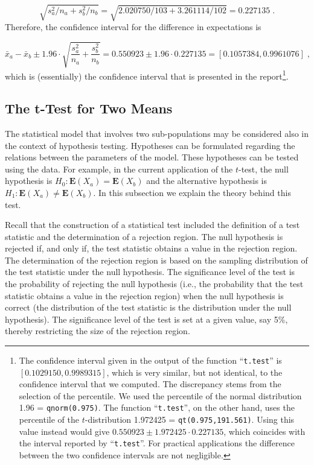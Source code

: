 \documentclass[]{krantz}
\newcommand{\Expec}{\mathbf{E}}
\theoremstyle{definition}
\theoremstyle{definition}
\theoremstyle{definition}
\theoremstyle{remark}
\begin{document}
\[\sqrt{s_a^2/n_a + s_b^2/n_b} = \sqrt{2.020750/103 + 3.261114/102} = 0.227135\;.\]
Therefore, the confidence interval for the difference in expectations is

\[\bar x_a- \bar x_b \pm 1.96 \cdot \sqrt{\frac{s_a^2}{n_a} + \frac{s_b^2}{n_b}} = 0.550923 \pm 1.96 \cdot 0.227135 = [0.1057384,0.9961076]\;,\]
which is (essentially) the confidence interval that is presented in the
report\footnote{The confidence interval given in the output of the function
  ``\texttt{t.test}'' is \([0.1029150, 0.9989315]\), which is very similar, but
  not identical, to the confidence interval that we computed. The
  discrepancy stems from the selection of the percentile. We used the
  percentile of the normal distribution 1.96 = \texttt{qnorm(0.975)}. The
  function ``\texttt{t.test}'', on the other hand, uses the percentile of the
  \(t\)-distribution 1.972425 = \texttt{qt(0.975,191.561)}. Using this value
  instead would give \(0.550923 \pm 1.972425 \cdot 0.227135\), which
  coincides with the interval reported by ``\texttt{t.test}''. For practical
  applications the difference between the two confidence intervals are
  not negligible.}.

\hypertarget{the-t-test-for-two-means}{%
\subsection{The t-Test for Two Means}\label{the-t-test-for-two-means}}

The statistical model that involves two sub-populations may be
considered also in the context of hypothesis testing. Hypotheses can be
formulated regarding the relations between the parameters of the model.
These hypotheses can be tested using the data. For example, in the
current application of the \(t\)-test, the null hypothesis is
\(H_0: \Expec(X_a) = \Expec(X_b)\) and the alternative hypothesis is
\(H_1: \Expec(X_a) \not= \Expec(X_b)\). In this subsection we explain the
theory behind this test.

Recall that the construction of a statistical test included the
definition of a test statistic and the determination of a rejection
region. The null hypothesis is rejected if, and only if, the test
statistic obtains a value in the rejection region. The determination of
the rejection region is based on the sampling distribution of the test
statistic under the null hypothesis. The significance level of the test
is the probability of rejecting the null hypothesis (i.e., the
probability that the test statistic obtains a value in the rejection
region) when the null hypothesis is correct (the distribution of the
test statistic is the distribution under the null hypothesis). The
significance level of the test is set at a given value, say 5\%, thereby
restricting the size of the rejection region.
\end{document}

